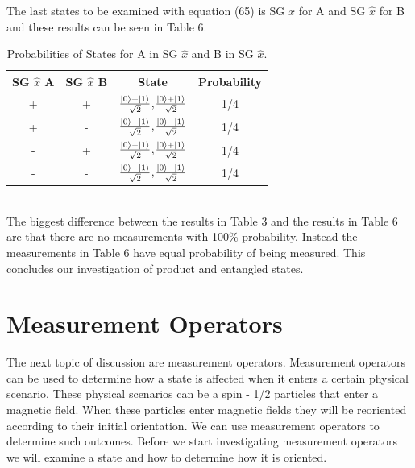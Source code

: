 \documentclass[twocolumn]{article}
\begin{document}
The last states to be examined with equation (65) is SG $\hat{x}$ for A and SG $\hat{x}$ for B and these results can be seen in Table 6.
\begin{table}[h!]
\begin{center}
\begin{tabular}{ |c|c|c|c| }
\hline SG $\hat{x}$ A& SG $\hat{x}$ B& State& Probability \\ 
\hline +& +& $\frac{\ket{0}+\ket{1}}{\sqrt{2}}$,$\frac{\ket{0}+\ket{1}}{\sqrt{2}}$& 1/4 \\  
\hline +& -& $\frac{\ket{0}+\ket{1}}{\sqrt{2}}$,$\frac{\ket{0}-\ket{1}}{\sqrt{2}}$& 1/4 \\
\hline -& +& $\frac{\ket{0}-\ket{1}}{\sqrt{2}}$,$\frac{\ket{0}+\ket{1}}{\sqrt{2}}$& 1/4 \\
\hline -& -& $\frac{\ket{0}-\ket{1}}{\sqrt{2}}$,$\frac{\ket{0}-\ket{1}}{\sqrt{2}}$& 1/4 \\
\hline    
\end{tabular}
\caption{Probabilities of States for A in SG $\hat{x}$ and B in SG $\hat{x}$.}
\end{center}
\end{table}
\\
The biggest difference between the results in Table 3 and the results in Table 6 are that there are no measurements with 100\% probability. Instead the measurements in Table 6 have equal probability of being measured. This concludes our investigation of product and entangled states.
\section*{Measurement Operators}
The next topic of discussion are measurement operators. Measurement operators can be used to determine how a state is affected when it enters a certain physical scenario. These physical scenarios can be a spin - 1/2 particles that enter a magnetic field. When these particles enter magnetic fields they will be reoriented according to their initial orientation. We can use measurement operators to determine such outcomes. Before we start investigating measurement operators we will examine a state and how to determine how it is oriented.
\end{document}
